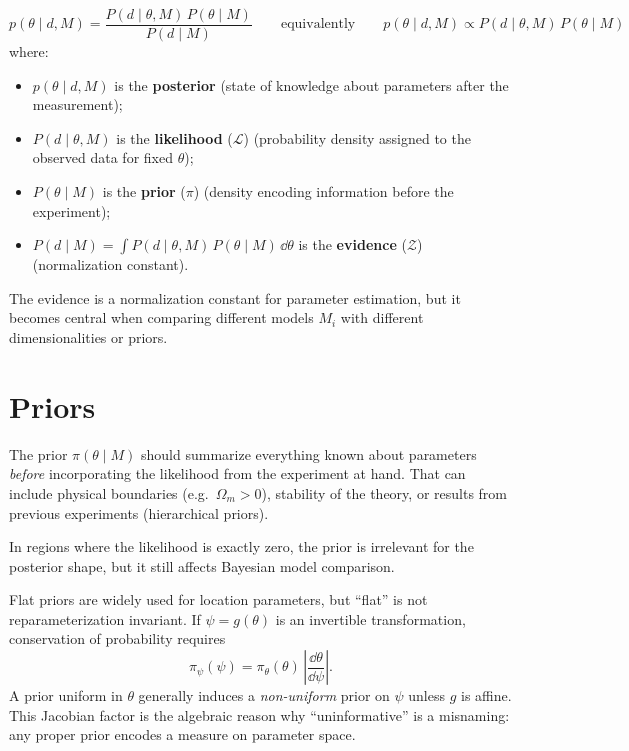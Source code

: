 \begin{definitionblock}
    $$
    p(\theta \mid d, M)
    = \frac{P(d \mid \theta, M)\,P(\theta \mid M)}{P(d \mid M)}
    \qquad\text{equivalently}\qquad
    p(\theta \mid d, M) \propto P(d \mid \theta, M)\,P(\theta \mid M)
    $$
    where:
    \begin{itemize}
        \item $p(\theta \mid d, M)$ is the \textbf{posterior} (state of knowledge about parameters after the measurement);
        \item $P(d \mid \theta, M)$ is the \textbf{likelihood} ($\mathcal{L}$) (probability density assigned to the observed data for fixed $\theta$);
        \item $P(\theta \mid M)$ is the \textbf{prior} ($\pi$) (density encoding information before the experiment);
        \item $P(d \mid M) = \int P(d \mid \theta, M)\,P(\theta \mid M)\,\dd{\theta}$ is the \textbf{evidence} ($\mathcal{Z}$) (normalization constant).
    \end{itemize}
\end{definitionblock}

The evidence is a normalization constant for parameter estimation, but it becomes central when comparing different models $M_i$ with different dimensionalities or priors.

\section{Priors}
\label{sec:priors}

The prior $\pi(\theta \mid M)$ should summarize everything known about parameters \emph{before} incorporating the likelihood from the experiment at hand. That can include physical boundaries (e.g.\ $\Omega_m > 0$), stability of the theory, or results from previous experiments (hierarchical priors).

In regions where the likelihood is exactly zero, the prior is irrelevant for the posterior shape, but it still affects Bayesian model comparison.

Flat priors are widely used for location parameters, but ``flat'' is not reparameterization invariant. If $\psi = g(\theta)$ is an invertible transformation, conservation of probability requires
$$
\pi_\psi(\psi) = \pi_\theta(\theta)\,\left|\frac{\dd{\theta}}{\dd{\psi}}\right|.
$$
A prior uniform in $\theta$ generally induces a \emph{non-uniform} prior on $\psi$ unless $g$ is affine. This Jacobian factor is the algebraic reason why ``uninformative'' is a misnaming: any proper prior encodes a measure on parameter space.

